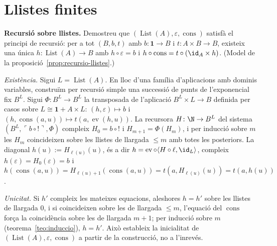 \section{Llistes finites}\label{prac:llistes}

\begin{exercici}
\textbf{Recursió sobre llistes.} Demostreu que \((\operatorname{List}(A),\varepsilon,\operatorname{cons})\) satisfà el principi de recursió: per a tot \((B,b,t)\) amb \(b\colon\mathbf1\to B\) i \(t\colon A\times B\to B\), existeix una única \(h\colon\operatorname{List}(A)\to B\) amb \(h\circ\varepsilon=b\) i \(h\circ\operatorname{cons}=t\circ(\id_A\times h)\). (Model de la proposició~\ref{prop:recursio-llistes}.)
\end{exercici}
\begin{solucio}
\emph{Existència.} Sigui \(L=\operatorname{List}(A)\). En lloc d'una família d'aplicacions amb dominis variables, construïm per recursió simple una successió de punts de l'exponencial fix \(B^{L}\). Sigui \(\Phi\colon B^{L}\to B^{L}\) la transposada de l'aplicació \(B^{L}\times L\to B\) definida per casos sobre \(L\cong\mathbf1+A\times L\): \((h,\varepsilon)\mapsto b\) i \((h,\operatorname{cons}(a,u))\mapsto t(a,\operatorname{ev}(h,u))\). La recursora \(H\colon\N\to B^{L}\) del sistema \((B^{L},\ulcorner b\circ{!}\urcorner,\Phi)\) compleix \(H_0=b\circ{!}\) i \(H_{m+1}=\Phi(H_m)\), i per inducció sobre \(m\) les \(H_m\) coincideixen sobre les llistes de llargada \(\le m\) amb totes les posteriors. La diagonal \(h(u):=H_{\ell(u)}(u)\), és a dir \(h=\operatorname{ev}\circ\langle H\circ\ell,\id_L\rangle\), compleix \(h(\varepsilon)=H_0(\varepsilon)=b\) i \(h(\operatorname{cons}(a,u))=H_{\ell(u)+1}(\operatorname{cons}(a,u))=t(a,H_{\ell(u)}(u))=t(a,h(u))\).

\emph{Unicitat.} Si \(h'\) compleix les mateixes equacions, aleshores \(h=h'\) sobre les llistes de llargada \(0\), i si coincideixen sobre les de llargada \(\le m\), l'equació del \(\operatorname{cons}\) força la coincidència sobre les de llargada \(m+1\); per inducció sobre \(m\) (teorema~\ref{teo:induccio}), \(h=h'\). Això estableix la inicialitat de \((\operatorname{List}(A),\varepsilon,\operatorname{cons})\) a partir de la construcció, no a l'inrevés.
\end{solucio}

